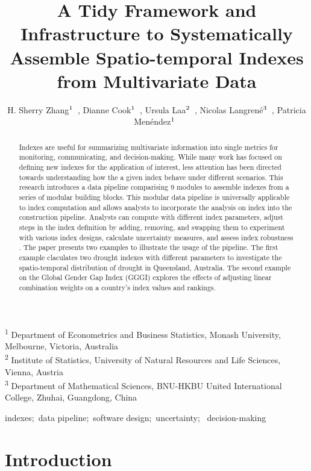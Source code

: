 \documentclass[
]{interact}
\title{A Tidy Framework and Infrastructure to Systematically Assemble
Spatio-temporal Indexes from Multivariate Data}
\author{H. Sherry
Zhang$\textsuperscript{1}$~\orcidlink{0000-0002-7122-1463}, Dianne
Cook$\textsuperscript{1}$~\orcidlink{0000-0002-3813-7155}, Ursula
Laa$\textsuperscript{2}$~\orcidlink{0000-0002-0249-6439}, Nicolas
Langrené$\textsuperscript{3}$~\orcidlink{0000-0001-7601-4618}, Patricia
Menéndez$\textsuperscript{1}$~\orcidlink{0000-0003-0701-6315}}
\begin{document}
\captionsetup{labelsep=space}
\maketitle
\textsuperscript{1} Department of Econometrics and Business
Statistics, Monash University, Melbourne,
Victoria, Australia\\ \textsuperscript{2} Institute of
Statistics, University of Natural Resources and Life
Sciences, Vienna, Austria\\ \textsuperscript{3} Department of
Mathematical Sciences, BNU-HKBU United International College, Zhuhai,
Guangdong, China
\begin{abstract}
Indexes are useful for summarizing multivariate information into single
metrics for monitoring, communicating, and decision-making. While many
work has focused on defining new indexes for the application of
interest, less attention has been directed towards understanding how the
a given index behave under different scenarios. This research introduces
a data pipeline comparising 9 modules to assemble indexes from a series
of modular building blocks. This modular data pipeline is universally
applicable to index computation and allows analysts to incorporate the
analysis on index into the construction pipeline. Analysts can compute
with different index parameters, adjust steps in the index definition by
adding, removing, and swapping them to experiment with various index
designs, calculate uncertainty measures, and assess index robustness .
The paper presents two examples to illustrate the usage of the pipeline.
The first example claculates two drought indexes with different
parameters to investigate the spatio-temporal distribution of drought in
Queensland, Australia. The second example on the Global Gender Gap Index
(GGGI) explores the effects of adjusting linear combination weights on a
country's index values and rankings.
\end{abstract}
\begin{keywords}
\def\sep{;\ }
indexes\sep data pipeline\sep software design\sep uncertainty\sep 
decision-making
\end{keywords}
\ifdefined\Shaded\renewenvironment{Shaded}{\begin{tcolorbox}[frame hidden, borderline west={3pt}{0pt}{shadecolor}, interior hidden, enhanced, boxrule=0pt, sharp corners, breakable]}{\end{tcolorbox}}\fi

\hypertarget{introduction}{%
\section{Introduction}\label{introduction}}
\end{document}
